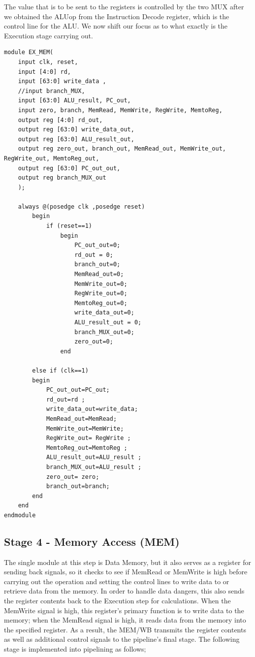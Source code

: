 \documentclass{article}
\begin{document}
The value that is to be sent to the registers is controlled by the two MUX after we obtained the ALUop from the Instruction Decode register, which is the control line for the ALU. We now shift our focus as to what exactly is the Execution stage carrying out. 

\begin{lstlisting}[caption={EX/MEM Register}, captionpos=b, language=RISC-V]
module EX_MEM(
    input clk, reset,
    input [4:0] rd,
    input [63:0] write_data , 
    //input branch_MUX,
    input [63:0] ALU_result, PC_out,
    input zero, branch, MemRead, MemWrite, RegWrite, MemtoReg, 
    output reg [4:0] rd_out,
    output reg [63:0] write_data_out, 
    output reg [63:0] ALU_result_out, 
    output reg zero_out, branch_out, MemRead_out, MemWrite_out, RegWrite_out, MemtoReg_out, 
    output reg [63:0] PC_out_out,
    output reg branch_MUX_out
    );

    always @(posedge clk ,posedge reset)
        begin
            if (reset==1)
                begin
                    PC_out_out=0;
                    rd_out = 0;
                    branch_out=0;
                    MemRead_out=0;
                    MemWrite_out=0;
                    RegWrite_out=0;
                    MemtoReg_out=0;
                    write_data_out=0; 
                    ALU_result_out = 0;
                    branch_MUX_out=0;
                    zero_out=0;
                end

        else if (clk==1)
        begin
            PC_out_out=PC_out;
            rd_out=rd ;
            write_data_out=write_data; 
            MemRead_out=MemRead;
            MemWrite_out=MemWrite;
            RegWrite_out= RegWrite ;
            MemtoReg_out=MemtoReg ;
            ALU_result_out=ALU_result ;
            branch_MUX_out=ALU_result ;
            zero_out= zero;
            branch_out=branch;  
        end
    end
endmodule

\end{lstlisting}

\subsection{Stage 4 - Memory Access (MEM)}

The single module at this step is Data Memory, but it also serves as a register for sending back signals, so it checks to see if MemRead or MemWrite is high before carrying out the operation and setting the control lines to write data to or retrieve data from the memory. In order to handle data dangers, this also sends the register contents back to the Execution step for calculations. When the MemWrite signal is high, this register's primary function is to write data to the memory; when the MemRead signal is high, it reads data from the memory into the specified register. As a result, the MEM/WB transmits the register contents as well as additional control signals to the pipeline's final stage. The following stage is implemented into pipelining as follows;
\end{document}
